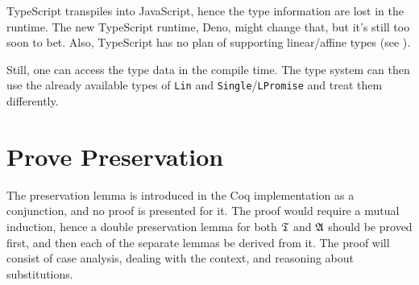 TypeScript transpiles into JavaScript, hence the type information are lost in the runtime. The new TypeScript runtime, Deno, might change that, but it's still too soon to bet. Also, TypeScript has no plan of supporting linear/affine types (see \cite{typescript-affine}).

Still, one can access the type data in the compile time. The type system can then use the already available types of \texttt{Lin} and \texttt{Single}/\texttt{LPromise} and treat them differently.

\section{Prove Preservation}

The preservation lemma is introduced in the Coq implementation as a conjunction, and no proof is presented for it. The proof would require a mutual induction, hence a double preservation lemma for both $\mathfrak{T}$ and $\mathfrak{A}$ should be proved first, and then each of the separate lemmas be derived from it. The proof will consist of case analysis, dealing with the context, and reasoning about substitutions.